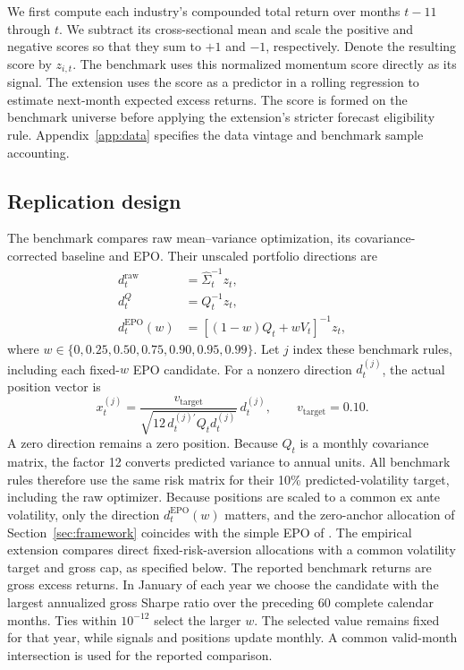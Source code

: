 We first compute each industry's compounded total return over months $t-11$ through $t$. We subtract its cross-sectional mean and scale the positive and negative scores so that they sum to $+1$ and $-1$, respectively. Denote the resulting score by $z_{i,t}$. The benchmark uses this normalized momentum score directly as its signal. The extension uses the score as a predictor in a rolling regression to estimate next-month expected excess returns. The score is formed on the benchmark universe before applying the extension's stricter forecast eligibility rule. Appendix~\ref{app:data} specifies the data vintage and benchmark sample accounting.


\subsection{Replication design}
The benchmark compares raw mean--variance optimization, its covariance-corrected baseline and EPO. Their unscaled portfolio directions are
\begin{equation}
\begin{aligned}
d_t^{\mathrm{raw}}&=\widehat\Sigma_t^{-1}z_t,\\
d_t^{Q}&=Q_t^{-1}z_t,\\
d_t^{\mathrm{EPO}}(w)&=[(1-w)Q_t+wV_t]^{-1}z_t,
\end{aligned}
\label{eq:benchmark-directions}
\end{equation}
where $w\in\{0,0.25,0.50,0.75,0.90,0.95,0.99\}$. Let $j$ index these benchmark rules, including each fixed-$w$ EPO candidate. For a nonzero direction $d_t^{(j)}$, the actual position vector is
\begin{equation}
x_t^{(j)}=
\frac{v_{\mathrm{target}}}
{\sqrt{12\,d_t^{(j)\prime}Q_t d_t^{(j)}}}\,d_t^{(j)},
\qquad v_{\mathrm{target}}=0.10.
\label{eq:benchmark-scaling}
\end{equation}
A zero direction remains a zero position. Because $Q_t$ is a monthly covariance matrix, the factor 12 converts predicted variance to annual units. All benchmark rules therefore use the same risk matrix for their 10\% predicted-volatility target, including the raw optimizer. Because positions are scaled to a common ex ante volatility, only the direction $d_t^{\mathrm{EPO}}(w)$ matters, and the zero-anchor allocation of Section~\ref{sec:framework} coincides with the simple EPO of \citet{pedersen2021}. The empirical extension compares direct fixed-risk-aversion allocations with a common volatility target and gross cap, as specified below. The reported benchmark returns are gross excess returns. In January of each year we choose the candidate with the largest annualized gross Sharpe ratio over the preceding 60 complete calendar months. Ties within $10^{-12}$ select the larger $w$. The selected value remains fixed for that year, while signals and positions update monthly. A common valid-month intersection is used for the reported comparison.


